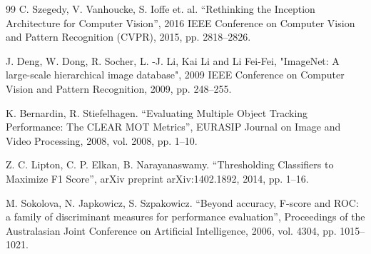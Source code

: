 \documentclass{misisarticle}
\begin{document}
\begin{thebibliography}{99}
 C. Szegedy, V. Vanhoucke, S. Ioffe et. al. “Rethinking the Inception Architecture for Computer Vision”, 2016 IEEE Conference on Computer Vision and Pattern Recognition (CVPR), 2015, pp. 2818–2826.

 J. Deng, W. Dong, R. Socher, L. -J. Li, Kai Li and Li Fei-Fei, "ImageNet: A large-scale hierarchical image database", 2009 IEEE Conference on Computer Vision and Pattern Recognition, 2009, pp. 248–255.

 K. Bernardin, R. Stiefelhagen. “Evaluating Multiple Object Tracking Performance: The CLEAR MOT Metrics”, EURASIP Journal on Image and Video Processing, 2008, vol. 2008, pp. 1–10.

 Z. C. Lipton, C. P. Elkan, B. Narayanaswamy. “Thresholding Classifiers to Maximize F1 Score”, arXiv preprint arXiv:1402.1892, 2014, pp. 1–16.

 M. Sokolova, N. Japkowicz, S. Szpakowicz. “Beyond accuracy, F-score and ROC: a family of discriminant measures for performance evaluation”, Proceedings of the Australasian Joint Conference on Artificial Intelligence, 2006, vol. 4304, pp. 1015–1021.

\end{thebibliography}
\end{document}
